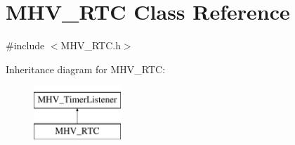 \hypertarget{class_m_h_v___r_t_c}{
\section{\-M\-H\-V\-\_\-\-R\-T\-C \-Class \-Reference}
\label{class_m_h_v___r_t_c}
}


{\ttfamily \#include $<$\-M\-H\-V\-\_\-\-R\-T\-C.\-h$>$}

\-Inheritance diagram for \-M\-H\-V\-\_\-\-R\-T\-C\-:\begin{figure}[H]
\begin{center}
\leavevmode
\includegraphics[height=2.000000cm]{class_m_h_v___r_t_c}
\end{center}
\end{figure}
